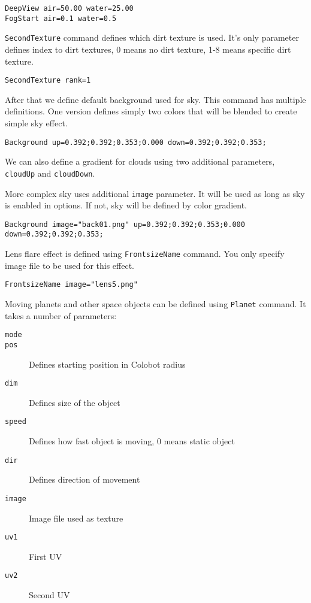 \begin{verbatim}
DeepView air=50.00 water=25.00
FogStart air=0.1 water=0.5
\end{verbatim}

\texttt{SecondTexture} command defines which dirt texture is used. It's only parameter defines index to dirt textures, 0 means no dirt texture, 1-8 means specific dirt texture.

\begin{verbatim}
SecondTexture rank=1
\end{verbatim}

After that we define default background used for sky. This command has multiple definitions. One version defines simply two colors that will be blended to create simple sky effect.

\begin{verbatim}
Background up=0.392;0.392;0.353;0.000 down=0.392;0.392;0.353;
\end{verbatim}

We can also define a gradient for clouds using two additional parameters, \texttt{cloudUp} and \texttt{cloudDown}.


More complex sky uses additional \texttt{image} parameter. It will be used as long as sky is enabled in options. If not, sky will be defined by color gradient.

\begin{verbatim}
Background image="back01.png" up=0.392;0.392;0.353;0.000 down=0.392;0.392;0.353;
\end{verbatim}

Lens flare effect is defined using \texttt{FrontsizeName} command. You only specify image file to be used for this effect.

\begin{verbatim}
FrontsizeName image="lens5.png"
\end{verbatim}

Moving planets and other space objects can be defined using \texttt{Planet} command. It takes a number of parameters:

\begin{description}
    \item[\texttt{mode}] 
    \item[\texttt{pos}] Defines starting position in Colobot radius
    \item[\texttt{dim}] Defines size of the object
    \item[\texttt{speed}] Defines how fast object is moving, 0 means static object
    \item[\texttt{dir}] Defines direction of movement
    \item[\texttt{image}] Image file used as texture
    \item[\texttt{uv1}] First UV
    \item[\texttt{uv2}] Second UV
\end{description}

